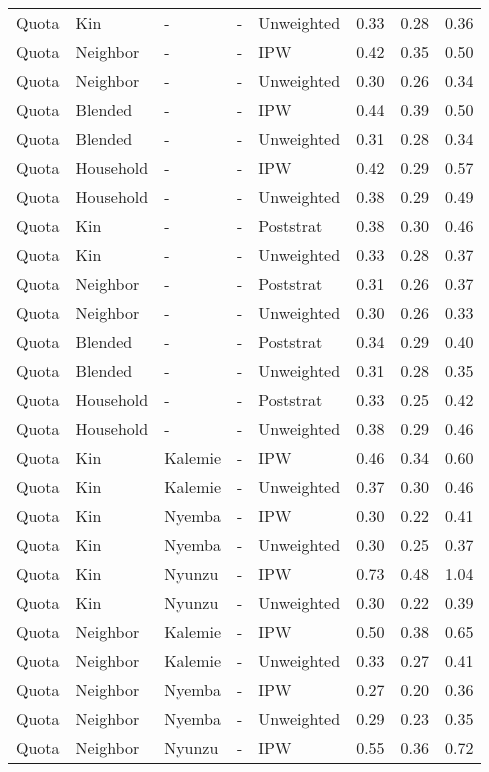 \begin{longtable}[t]{lllllrrr}
Quota & Kin & - & - & Unweighted & 0.33 & 0.28 & 0.36\\
Quota & Neighbor & - & - & IPW & 0.42 & 0.35 & 0.50\\
Quota & Neighbor & - & - & Unweighted & 0.30 & 0.26 & 0.34\\
\addlinespace
Quota & Blended & - & - & IPW & 0.44 & 0.39 & 0.50\\
Quota & Blended & - & - & Unweighted & 0.31 & 0.28 & 0.34\\
Quota & Household & - & - & IPW & 0.42 & 0.29 & 0.57\\
Quota & Household & - & - & Unweighted & 0.38 & 0.29 & 0.49\\
Quota & Kin & - & - & Poststrat & 0.38 & 0.30 & 0.46\\
\addlinespace
Quota & Kin & - & - & Unweighted & 0.33 & 0.28 & 0.37\\
Quota & Neighbor & - & - & Poststrat & 0.31 & 0.26 & 0.37\\
Quota & Neighbor & - & - & Unweighted & 0.30 & 0.26 & 0.33\\
Quota & Blended & - & - & Poststrat & 0.34 & 0.29 & 0.40\\
Quota & Blended & - & - & Unweighted & 0.31 & 0.28 & 0.35\\
\addlinespace
Quota & Household & - & - & Poststrat & 0.33 & 0.25 & 0.42\\
Quota & Household & - & - & Unweighted & 0.38 & 0.29 & 0.46\\
Quota & Kin & Kalemie & - & IPW & 0.46 & 0.34 & 0.60\\
Quota & Kin & Kalemie & - & Unweighted & 0.37 & 0.30 & 0.46\\
Quota & Kin & Nyemba & - & IPW & 0.30 & 0.22 & 0.41\\
\addlinespace
Quota & Kin & Nyemba & - & Unweighted & 0.30 & 0.25 & 0.37\\
Quota & Kin & Nyunzu & - & IPW & 0.73 & 0.48 & 1.04\\
Quota & Kin & Nyunzu & - & Unweighted & 0.30 & 0.22 & 0.39\\
Quota & Neighbor & Kalemie & - & IPW & 0.50 & 0.38 & 0.65\\
Quota & Neighbor & Kalemie & - & Unweighted & 0.33 & 0.27 & 0.41\\
\addlinespace
Quota & Neighbor & Nyemba & - & IPW & 0.27 & 0.20 & 0.36\\
Quota & Neighbor & Nyemba & - & Unweighted & 0.29 & 0.23 & 0.35\\
Quota & Neighbor & Nyunzu & - & IPW & 0.55 & 0.36 & 0.72\\

\end{longtable}
